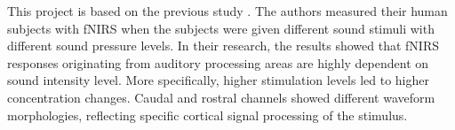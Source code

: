 This project is based on the previous study \cite{Weder2018}. The authors measured their human subjects with fNIRS when the subjects were given different sound stimuli with different sound pressure levels. In their research, the results showed that fNIRS responses originating from auditory processing areas are highly dependent on sound intensity level. More specifically, higher stimulation levels led to higher concentration changes. Caudal and rostral channels showed different waveform morphologies, reflecting specific cortical signal processing of the stimulus. 




